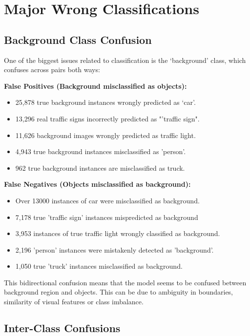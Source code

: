 \documentclass[12pt,a4paper]{report}
\theoremstyle{definition}
\theoremstyle{remark}
\begin{document}
\section*{Major Wrong Classifications}

\subsection*{Background Class Confusion}

One of the biggest issues related to classification is the ‘background’ class, which confuses across pairs both ways:

\textbf{False Positives (Background misclassified as objects):}
\begin{itemize}
	\item 25,878 true background instances wrongly predicted as ‘car’.
	\item 13,296 real traffic signs incorrectly predicted as "'traffic sign".
	\item 11,626 background images wrongly predicted as traffic light.
	\item 4,943 true background instances misclassified as 'person'.
	\item 962 true background instances are misclassified as truck.
\end{itemize}

\textbf{False Negatives (Objects misclassified as background):}
\begin{itemize}
	\item Over 13000 instances of car were misclassified as background.
	\item 7,178 true 'traffic sign' instances mispredicted as background
	\item 3,953 instances of true traffic light wrongly classified as background.
	\item 2,196 'person' instances were mistakenly detected as 'background'.
	\item 1,050 true 'truck' instances misclassified as background.
\end{itemize}

This bidirectional confusion means that the model seems to be confused between background region and objects. This can be due to ambiguity in boundaries, similarity of visual features or class imbalance.

\subsection*{Inter-Class Confusions}
\end{document}
